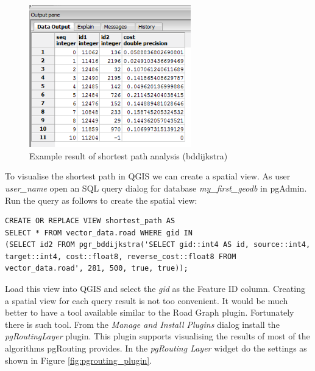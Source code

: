 \documentclass[a4paper,12pt,titlepage]{article}
\begin{document}
\begin{figure}[htb]
	\centering
	\includegraphics[width=7cm]{Images/routing_result.png}
	\caption{Example result of shortest path analysis (bddijkstra)}\label{fig:routing_result}
\end{figure}

To visualise the shortest path in QGIS we can create a spatial view. As user \textit{user\_name} open an SQL query dialog for database \textit{my\_first\_geodb} in pgAdmin. Run the query as follows to create the spatial view:

\begin{lstlisting}[caption={Create a spatial view to visualise the analysis results}]
CREATE OR REPLACE VIEW shortest_path AS
SELECT * FROM vector_data.road WHERE gid IN
(SELECT id2 FROM pgr_bddijkstra('SELECT gid::int4 AS id, source::int4, target::int4, cost::float8, reverse_cost::float8 FROM vector_data.road', 281, 500, true, true));
\end{lstlisting}

Load this view into QGIS and select the \textit{gid} as the Feature ID column. Creating a spatial view for each query result is not too convenient. It would be much better to have a tool available similar to the Road Graph plugin. Fortunately there is such tool. From the \textit{Manage and Install Plugins} dialog install the \textit{pgRoutingLayer} plugin. This plugin supports visualising the results of most of the algorithms pgRouting provides. In the \textit{pgRouting Layer} widget do the settings as shown in Figure \ref{fig:pgrouting_plugin}.
\end{document}
